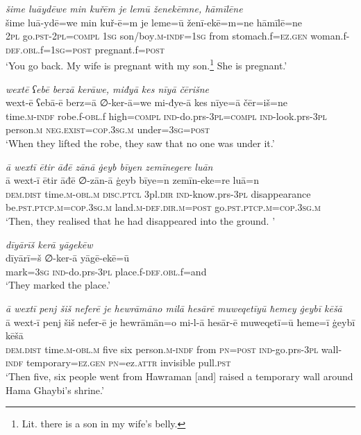 \ea \label{BP.185}
\textit{šime luāydēwe min kuřēm je lemū ženekēmne, hāmīlēne} \\ 
\gll šime luā-ydē=we min kuř-ē=m je leme=ū ženī-ekē=m=ne hāmīlē=ne \\ 
 \textsc{2pl} go\textsc{.pst}-\textsc{2pl}\textsc{=compl} \textsc{1sg} son/boy\textsc{.m}\textsc{-indf}\textsc{=\textsc{1sg}} from stomach.f\textsc{=ez.gen} woman.f\textsc{-def}\textsc{.obl}.f\textsc{=\textsc{1sg}}\textsc{=\textsc{post}} pregnant.f\textsc{=\textsc{post}} \\ 
\glt `You go back. My wife is pregnant with my son.\footnote{Lit. there is a son in my wife’s belly.} She is pregnant.'
\z 
 
\ea \label{BP.194}
\textit{wextē ʕebē berzā kerāwe, miđyā kes nīyā čērišne} \\ 
\gll wext-ē ʕebā-ē berz=ā ∅-ker-ā=we mi-đye-ā kes nīye=ā čēr=iš=ne \\ 
 time\textsc{.m}\textsc{-indf} robe.f\textsc{-obl}.f high\textsc{=compl} \textsc{ind-}do.prs\textsc{-3pl}\textsc{=compl} \textsc{ind-}look.prs\textsc{-3pl} person\textsc{.m} \textsc{\textsc{neg.}exist}\textsc{=cop}\textsc{.3sg}\textsc{.m} under\textsc{=3sg}\textsc{=\textsc{post}} \\ 
\glt `When they lifted the robe, they saw that no one was under it.'
\z 
 
\ea \label{BP.197}
\textit{ā wextī ētir āđē zānā ġeyb bīyen zemīnegere luān} \\ 
\gll ā wext-ī ētir āđē ∅-zān-ā ġeyb bīye=n zemīn-eke=re luā=n \\ 
 \textsc{dem.dist} time\textsc{.m}\textsc{-obl}\textsc{.m} \textsc{disc.ptcl} 3pl\textsc{.dir} \textsc{ind-}know.prs\textsc{-3pl} disappearance be\textsc{.pst}\textsc{.ptcp}\textsc{.m}\textsc{=cop}\textsc{.3sg}\textsc{.m} land\textsc{.m}\textsc{-def}\textsc{.dir}\textsc{.m}\textsc{=\textsc{post}} go\textsc{.pst}\textsc{.ptcp}\textsc{.m}\textsc{=cop}\textsc{.3sg}\textsc{.m} \\ 
\glt `Then, they realised that he had disappeared into the ground. '
\z 
 
\ea \label{BP.200}
\textit{dīyārīš kerā yāgekēw} \\ 
\gll dīyārī=š ∅-ker-ā yāgē-ekē=ū \\ 
 mark\textsc{=3sg} \textsc{ind-}do.prs\textsc{-3pl} place.f\textsc{-def}\textsc{.obl}.f=and \\ 
\glt `They marked the place.'
\z 
 
\ea \label{BP.203}
\textit{ā wextī penj šiš neferē je hewrāmāno milā hesārē muweqetīyū ħemey ġeybī kēšā} \\ 
\gll ā wext-ī penj šiš nefer-ē je hewrāmān=o mi-l-ā hesār-ē muweqetī=ū ħeme=ī ġeybī kēšā \\ 
 \textsc{dem.dist} time\textsc{.m}\textsc{-obl}\textsc{.m} five six person\textsc{.m}\textsc{-indf} from \textsc{pn}\textsc{=\textsc{post}} \textsc{ind-}go.prs\textsc{-3pl} wall\textsc{-indf} temporary\textsc{=ez.gen} \textsc{pn}=ez.\textsc{attr} invisible pull\textsc{.pst} \\ 
\glt `Then five, six people went from Hawraman [and] raised a temporary wall around Hama Ghaybi’s shrine.'
\z 
 
